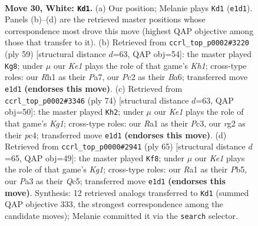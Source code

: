 \documentclass[11pt]{article}
\begin{document}
\clearpage

\begin{figure}[p]\centering
\begin{subfigure}{0.46\textwidth}\centering
\resizebox{\linewidth}{!}{%
\newchessgame
\chessboard[
  setfen={1Qb2k2/4n3/8/4Pp2/p3q3/P7/2P3rp/R3K2R w - - 2 30},
  showmover=false,
  pgfstyle=straightmove, color=movearrow, markmove={e1-d1}
]}
\caption{}
\end{subfigure}\hfill
\begin{subfigure}{0.46\textwidth}\centering
\resizebox{\linewidth}{!}{%
\newchessgame
\chessboard[
  setfen={r6k/p7/bpp2Q1p/5P2/5qP1/7P/PP6/1K1R4 b - - 6 30},
  showmover=false,
  pgfstyle=straightmove, color=movearrow, markmove={h8-g8}
]}
\caption{}
\end{subfigure}
\\[4pt]
\begin{subfigure}{0.46\textwidth}\centering
\resizebox{\linewidth}{!}{%
\newchessgame
\chessboard[
  setfen={6k1/6p1/p3p3/1pn5/2p3RP/P1P2P2/2Q5/4q1K1 w - - 1 38},
  showmover=false,
  pgfstyle=straightmove, color=movearrow, markmove={g1-h2}
]}
\caption{}
\end{subfigure}\hfill
\begin{subfigure}{0.46\textwidth}\centering
\resizebox{\linewidth}{!}{%
\newchessgame
\chessboard[
  setfen={4r1k1/1b6/p3p1Q1/1pq5/8/P1N2nP1/1PP1R3/2K5 b - - 2 33},
  showmover=false,
  pgfstyle=straightmove, color=movearrow, markmove={g8-f8}
]}
\caption{}
\end{subfigure}
\caption{\textbf{Move 30, White: \texttt{Kd1}.} (a) Our position; Melanie plays \texttt{Kd1} (\texttt{e1d1}). Panels (b)--(d) are the retrieved master positions whose correspondence most drove this move (highest QAP objective among those that transfer to it). (b) Retrieved from \texttt{ccrl\_top\_p0002\#3220} (ply 59) [structural distance $d$=63, QAP obj=54]: the master played \texttt{Kg8}; under $\mu$ our \emph{Ke1} plays the role of that game's \emph{Kh1}; cross-type roles: our \emph{R}h1 as their \emph{P}a7, our \emph{P}c2 as their \emph{B}a6; transferred move \texttt{e1d1} \textbf{(endorses this move)}. (c) Retrieved from \texttt{ccrl\_top\_p0002\#3346} (ply 74) [structural distance $d$=63, QAP obj=50]: the master played \texttt{Kh2}; under $\mu$ our \emph{Ke1} plays the role of that game's \emph{Kg1}; cross-type roles: our \emph{R}a1 as their \emph{P}c3, our \emph{r}g2 as their \emph{p}c4; transferred move \texttt{e1d1} \textbf{(endorses this move)}. (d) Retrieved from \texttt{ccrl\_top\_p0000\#2941} (ply 65) [structural distance $d$=65, QAP obj=49]: the master played \texttt{Kf8}; under $\mu$ our \emph{Ke1} plays the role of that game's \emph{Kg1}; cross-type roles: our \emph{R}a1 as their \emph{P}b5, our \emph{P}a3 as their \emph{Q}c5; transferred move \texttt{e1d1} \textbf{(endorses this move)}. Synthesis: 12 retrieved analogs transferred to \texttt{Kd1} (summed QAP objective 333, the strongest correspondence among the candidate moves); Melanie committed it via the \texttt{search} selector.}
\label{fig:thought-m58}
\end{figure}
\end{document}
